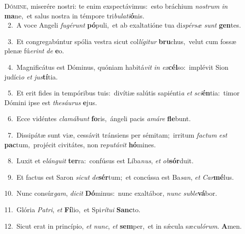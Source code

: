 \lettrine{\initial\textcolor{\initialcolor}{D}}{ómine,} miserére nostri: te enim exspectávimus:~\dagger esto bráchium \textit{nos}\-\textit{trum} \textit{in} \textbf{ma}\-ne,~\star et salus nostra in témpore tri\-\textit{bu}\-\textit{la}\textit{ti}\textbf{ó}nis.\\
{\numbfont\textcolor{\numbcolor}{~2.}}~A voce Angeli \textit{fu}\-\textit{gé}\textit{runt} \textbf{pó}\-puli,~\star et ab exaltatióne tua di\-\textit{spér}\-\textit{sæ} \textit{sunt} \textbf{gen}\-tes.\par
{\numbfont\textcolor{\numbcolor}{~3.}}~Et congregabúntur spólia vestra sicut col\-\textit{lí}\-\textit{gi}\textit{tur} \textbf{bru}\-chus,~\star velut cum fossæ plenæ fú\-\textit{e}\-\textit{rint} \textit{de} \textbf{e}\-o.\par
{\numbfont\textcolor{\numbcolor}{~4.}}~Magnificátus est Dóminus, quóniam habitá\textit{vit} \textit{in} \textit{ex}\-\textbf{cél}so:~\star implévit Sion judíci\textit{o} \textit{et} \textit{jus}\-\textbf{tí}tia.\par
{\numbfont\textcolor{\numbcolor}{~5.}}~Et erit fides in tempóribus tuis:~\dagger divítiæ salútis sapiénti\textit{a} \textit{et} \textit{sci}\-\textbf{én}tia:~\star timor Dómini ipse est \textit{the}\-\textit{sáu}\textit{rus} \textbf{e}\-jus.\par
{\numbfont\textcolor{\numbcolor}{~6.}}~Ecce vidéntes \textit{cla}\-\textit{má}\textit{bunt} \textbf{fo}\-ris,~\star ángeli pacis \textit{a}\-\textit{má}\textit{re} \textbf{fle}\-bunt.\par
{\numbfont\textcolor{\numbcolor}{~7.}}~Dissipátæ sunt viæ, cessávit tránsiens per sémitam;~\dagger irritum \textit{fac}\-\textit{tum} \textit{est} \textbf{pac}\-tum,~\star projécit civitátes, non re\-\textit{pu}\-\textit{tá}\textit{vit} \textbf{hó}\-mines.\par
{\numbfont\textcolor{\numbcolor}{~8.}}~Luxit et e\-\textit{lán}\-\textit{gu}\textit{it} \textbf{ter}\-ra:~\star confúsus est Líba\-\textit{nus}\-, \textit{et} \textit{ob}\-\textbf{sór}duit.\par
{\numbfont\textcolor{\numbcolor}{~9.}}~Et factus est Saron \textit{sic}\-\textit{ut} \textit{de}\-\textbf{sér}tum;~\star et concússa est Ba\-\textit{san}\-, \textit{et} \textit{Car}\-\textbf{mé}lus.\par
{\numbfont\textcolor{\numbcolor}{10.}}~Nunc consúr\-\textit{gam}\-, \textit{di}\-\textit{cit} \textbf{Dó}\-minus:~\star nunc exaltábor, \textit{nunc} \textit{sub}\-\textit{le}\textbf{vá}bor.\par
{\numbfont\textcolor{\numbcolor}{11.}}~Glória \textit{Pa}\-\textit{tri}, \textit{et} \textbf{Fí}\-lio,~\star et Spi\-\textit{rí}\-\textit{tu}\textit{i} \textbf{Sanc}\-to.\par
{\numbfont\textcolor{\numbcolor}{12.}}~Sicut erat in princípio, \textit{et} \textit{nunc}\-, \textit{et} \textbf{sem}\-per,~\star et in sǽcula sæ\-\textit{cu}\-\textit{ló}\textit{rum}. \textbf{A}\-men.\par
